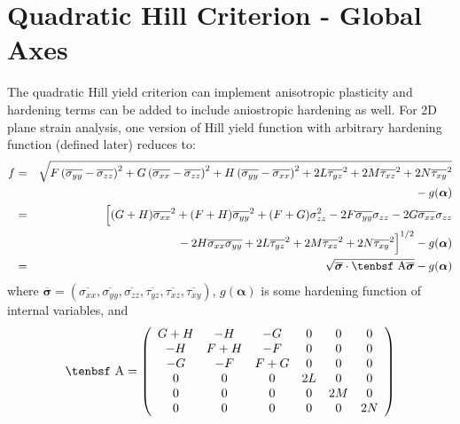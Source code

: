 \documentclass[11pt]{book}
\renewcommand{\vec}[1]{\boldsymbol{#1}}
\def\A{\hbox{\tenbsf A}}
\def\s#1{\sigma_{#1}}
\def\t#1{\tau_{#1}}
\begin{document}
\section{Quadratic Hill Criterion - Global Axes}

The quadratic Hill yield criterion can implement anisotropic plasticity and hardening terms can be added to include aniostropic hardening as well. For 2D plane strain analysis, one version of Hill yield function with arbitrary hardening function (defined later) reduces to:
\begin{eqnarray}
          f & = & \sqrt{F\left(\overline{\s{yy}}- \overline{\s{zz}}\right)^2 + G\left(\overline{\s{xx}}- \overline{\s{zz}}\right)^2
               + H\left(\overline{\s{yy}}- \overline{\s{xx}}\right)^2 +2L\overline{\t{yz}}^2 +2M\overline{\t{xz}}^2
                 +2N\overline{\t{xy}}^2}
  \nonumber\\
 &&\qquad\mbox{}
                 - g(\vec\alpha) \\
             & = & \Bigl[(G+H)\overline{\s{xx}}^2  + (F+H)\overline{\s{yy}}^2 + (F+G)\s{zz}^2
                   -2F \overline{\s{yy}}\s{zz} - 2G \overline{\s{xx}}\s{zz}
 \nonumber\\
 &&\qquad\mbox{}
                    - 2H \overline{\s{xx}}\overline{\s{yy}}
                   +2L\overline{\t{yz}}^2 +2M\overline{\t{xz}}^2+2N\overline{\t{xy}}^2\Bigr]^{1/2}  - g(\vec\alpha) \\
             & = & \sqrt{\overline{\vec\sigma} \cdot \A \overline{\vec\sigma}} - g(\vec\alpha)       \label{froteq}
\end{eqnarray}
where $\overline{\vec\sigma} = (\overline{\s{xx}}, \overline{\s{yy}}, \overline{\s{zz}}, \overline{\t{yz}}, \overline{\t{xz}}, \overline{\t{xy}})$, $g(\vec\alpha)$ is some hardening function of internal variables, and
\begin{equation}
      \A = \left( \begin{array}{cccccc}
                       G+H & -H & -G & 0 & 0 & 0 \\
                       -H & F+H & -F & 0 & 0 & 0\\
                       -G & -F & F+G & 0 & 0 & 0\\
                        0 & 0 & 0 & 2L & 0 & 0 \\
                       0 & 0 & 0 & 0 & 2M & 0 \\
                      0 & 0 & 0 & 0 & 0 & 2N
                       \end{array} \right)
\end{equation}
\end{document}
